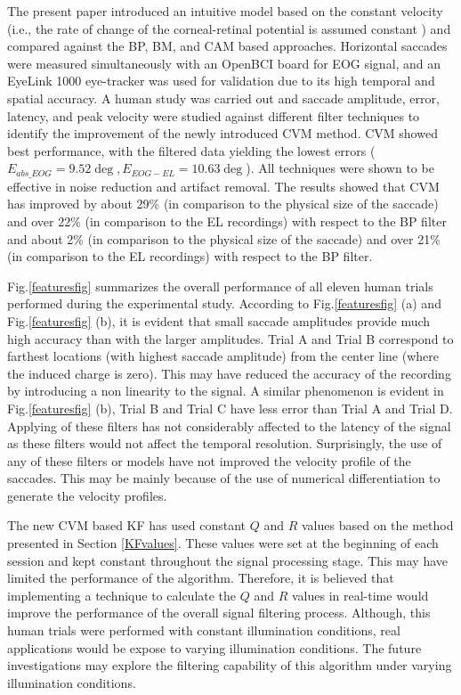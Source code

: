 \documentclass[transmag]{IEEEtran}
\begin{document}
The present paper introduced an intuitive model based on the constant velocity (i.e., the rate of change of the corneal-retinal potential is assumed constant ) and compared against the BP, BM, and CAM based approaches. Horizontal saccades were measured simultaneously with an OpenBCI board for EOG signal, and an EyeLink 1000 eye-tracker was used for validation due to its high temporal and spatial accuracy. A human study was carried out and saccade amplitude, error, latency, and peak velocity were studied against different filter techniques to identify the improvement of the newly introduced CVM method. CVM showed best performance, with the filtered data yielding the lowest errors ($E_{abs\_EOG} = 9.52 \si{\deg}, E_{EOG-EL} = 10.63 \si{\deg}$). All techniques were shown to be effective in noise reduction and artifact removal. The results showed that CVM has improved by about 29\% (in comparison to the physical size of the saccade) and over 22\% (in comparison to the EL recordings) with respect to the BP filter and about 2\% (in comparison to the physical size of the saccade) and over 21\% (in comparison to the EL recordings) with respect to the BP filter.


Fig.\ref{featuresfig} summarizes the overall performance of all eleven human trials performed during the experimental study. According to Fig.\ref{featuresfig} (a) and Fig.\ref{featuresfig} (b), it is evident that small saccade amplitudes provide much high accuracy than with the larger amplitudes. Trial A and Trial B correspond to farthest locations (with highest saccade amplitude) from the center line (where the induced charge is zero). This may have reduced the accuracy of the recording by introducing a non linearity to the signal.  A similar phenomenon is evident in Fig.\ref{featuresfig} (b), Trial B and Trial C have less error than Trial A and Trial D.  Applying of these filters has not considerably affected to the latency of the signal as these filters would not affect the temporal resolution. Surprisingly, the use of any of these filters or models have not improved the velocity profile of the saccades. This may be mainly because of the use of numerical differentiation to generate the velocity profiles. 

The new CVM based KF has used constant $Q$ and $R$ values based on the method presented in Section \ref{KFvalues}. These values were set at the beginning of each session and kept constant throughout the signal processing stage. This may have limited the performance of the algorithm. Therefore, it is believed that implementing a technique to calculate the $Q$ and $R$ values in real-time would improve the performance of the overall signal filtering process. Although, this human trials were performed with constant illumination conditions, real applications would be expose to varying illumination conditions. The future investigations may explore the filtering capability of this algorithm under varying illumination conditions.  
\end{document}
